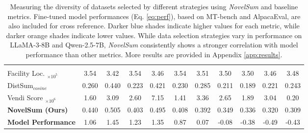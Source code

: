 \begin{table*}[!t]
{\begin{tabular}{lcccccccccc}
    \midrule
    \midrule
    \rowcolor{gray!15} \multicolumn{11}{c}{\textit{Qwen-2.5-7B}} \\
    Facility Loc. $_{\times10^5}$ & \cellcolor{BLUE!40} 3.54 & \cellcolor{ORANGE!30} 3.42 & \cellcolor{BLUE!40} 3.54 & \cellcolor{ORANGE!20} 3.46 & \cellcolor{BLUE!40} 3.54 & \cellcolor{BLUE!30} 3.51 & \cellcolor{BLUE!10} 3.50 & \cellcolor{BLUE!10} 3.50 & \cellcolor{ORANGE!20} 3.46 & \cellcolor{BLUE!0} 3.48 \\ 
    DistSum$_{cosine}$ & \cellcolor{BLUE!30} 0.260 & \cellcolor{BLUE!60} 0.440 & \cellcolor{BLUE!0} 0.223 & \cellcolor{BLUE!50} 0.421 & \cellcolor{BLUE!10} 0.230 & \cellcolor{BLUE!40} 0.285 & \cellcolor{ORANGE!20} 0.211 & \cellcolor{ORANGE!30} 0.189 & \cellcolor{ORANGE!10} 0.221 & \cellcolor{BLUE!20} 0.243 \\
    Vendi Score $_{\times10^6}$ & \cellcolor{ORANGE!10} 1.60 & \cellcolor{BLUE!40} 3.09 & \cellcolor{BLUE!10} 2.60 & \cellcolor{BLUE!60} 7.15 & \cellcolor{ORANGE!20} 1.41 & \cellcolor{BLUE!50} 3.36 & \cellcolor{BLUE!20} 2.65 & \cellcolor{BLUE!0} 1.89 & \cellcolor{BLUE!30} 3.04 & \cellcolor{ORANGE!30} 0.20 \\
    \textbf{NovelSum (Ours)}  & \cellcolor{BLUE!40} 0.440 & \cellcolor{BLUE!60} 0.505 & \cellcolor{BLUE!20} 0.403 & \cellcolor{BLUE!50} 0.495 & \cellcolor{BLUE!30} 0.408 & \cellcolor{BLUE!10} 0.392 & \cellcolor{BLUE!0} 0.349 & \cellcolor{ORANGE!10} 0.336 & \cellcolor{ORANGE!20} 0.320 & \cellcolor{ORANGE!30} 0.309 \\
    \midrule
    \textbf{Model Performance} & \cellcolor{BLUE!30} 1.06 & \cellcolor{BLUE!60} 1.45 & \cellcolor{BLUE!40} 1.23 & \cellcolor{BLUE!50} 1.35 & \cellcolor{BLUE!20} 0.87 & \cellcolor{BLUE!10} 0.07 & \cellcolor{BLUE!0} -0.08 & \cellcolor{ORANGE!10} -0.38 & \cellcolor{ORANGE!30} -0.49 & \cellcolor{ORANGE!20} -0.43 \\
    \bottomrule
    \end{tabular}
    }
    \caption{Measuring the diversity of datasets selected by different strategies using \textit{NovelSum} and baseline metrics. Fine-tuned model performances (Eq. \ref{eq:perf}), based on MT-bench and AlpacaEval, are also included for cross reference. Darker \colorbox{BLUE!60}{blue} shades indicate higher values for each metric, while darker \colorbox{ORANGE!30}{orange} shades indicate lower values. While data selection strategies vary in performance on LLaMA-3-8B and Qwen-2.5-7B, \textit{NovelSum} consistently shows a stronger correlation with model performance than other metrics. More results are provided in Appendix \ref{app:results}.}
    \label{tbl:main}
    \vspace{-4mm}
\end{table*}


